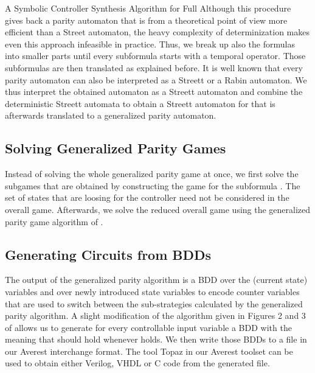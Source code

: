 \documentclass[copyright,creativecommons]{eptcs}
\begin{document}
\begin{section}{A Symbolic Controller Synthesis Algorithm for Full }
Although this procedure gives back a parity automaton that is from a theoretical point of view more efficient than a Street automaton, the heavy complexity of determinization makes even this approach infeasible in practice. Thus, we break up also the formulas  into smaller parts until every subformula starts with a temporal operator. Those subformulas are then translated as explained before. It is well known that every parity automaton can also be interpreted as a Streett or a Rabin automaton. We thus interpret the obtained automaton as a Streett automaton and combine the deterministic Streett automata to obtain a Streett automaton for  that is afterwards translated to a generalized parity automaton.



\subsection{Solving Generalized Parity Games}
Instead of solving the whole generalized parity game at once, we first solve the subgames that are obtained by constructing the game for the subformula . The set of states that are loosing for the controller need not be considered in the overall game. Afterwards, we solve the reduced overall game using the generalized parity game algorithm of \cite{ChHP07a}.

\subsection{Generating Circuits from BDDs}
The output of the generalized parity algorithm is a BDD over the (current state) variables  and over newly introduced state variables  to encode counter variables that are used to switch between the sub-strategies calculated by the generalized parity algorithm. A slight modification of the algorithm given in Figures 2 and 3 of \cite{BGJP07a} allows us to generate for every controllable input variable  a BDD  with the meaning that  should hold whenever  holds. We then write those BDDs to a file in our Averest interchange format. The tool Topaz in our Averest toolset can be used to obtain either Verilog, VHDL or C code from the generated file.

\end{section}
\end{document}
